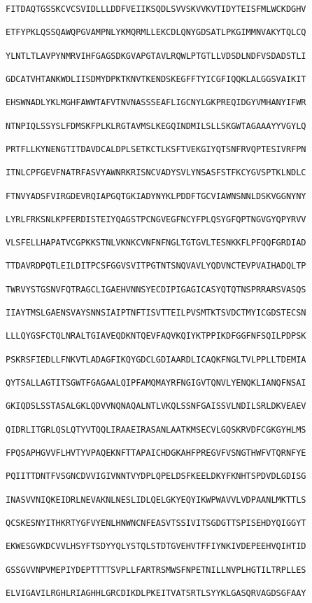 \documentclass[en,black,10pt,normal]{elegantnote}
\begin{document}
\begin{lstlisting}[frame=single]
FITDAQTGSSKCVCSVIDLLLDDFVEIIKSQDLSVVSKVVKVTIDYTEISFMLWCKDGHV

ETFYPKLQSSQAWQPGVAMPNLYKMQRMLLEKCDLQNYGDSATLPKGIMMNVAKYTQLCQ

YLNTLTLAVPYNMRVIHFGAGSDKGVAPGTAVLRQWLPTGTLLVDSDLNDFVSDADSTLI

GDCATVHTANKWDLIISDMYDPKTKNVTKENDSKEGFFTYICGFIQQKLALGGSVAIKIT

EHSWNADLYKLMGHFAWWTAFVTNVNASSSEAFLIGCNYLGKPREQIDGYVMHANYIFWR

NTNPIQLSSYSLFDMSKFPLKLRGTAVMSLKEGQINDMILSLLSKGWTAGAAAYYVGYLQ

PRTFLLKYNENGTITDAVDCALDPLSETKCTLKSFTVEKGIYQTSNFRVQPTESIVRFPN

ITNLCPFGEVFNATRFASVYAWNRKRISNCVADYSVLYNSASFSTFKCYGVSPTKLNDLC

FTNVYADSFVIRGDEVRQIAPGQTGKIADYNYKLPDDFTGCVIAWNSNNLDSKVGGNYNY

LYRLFRKSNLKPFERDISTEIYQAGSTPCNGVEGFNCYFPLQSYGFQPTNGVGYQPYRVV

VLSFELLHAPATVCGPKKSTNLVKNKCVNFNFNGLTGTGVLTESNKKFLPFQQFGRDIAD

TTDAVRDPQTLEILDITPCSFGGVSVITPGTNTSNQVAVLYQDVNCTEVPVAIHADQLTP

TWRVYSTGSNVFQTRAGCLIGAEHVNNSYECDIPIGAGICASYQTQTNSPRRARSVASQS

IIAYTMSLGAENSVAYSNNSIAIPTNFTISVTTEILPVSMTKTSVDCTMYICGDSTECSN

LLLQYGSFCTQLNRALTGIAVEQDKNTQEVFAQVKQIYKTPPIKDFGGFNFSQILPDPSK

PSKRSFIEDLLFNKVTLADAGFIKQYGDCLGDIAARDLICAQKFNGLTVLPPLLTDEMIA

QYTSALLAGTITSGWTFGAGAALQIPFAMQMAYRFNGIGVTQNVLYENQKLIANQFNSAI

GKIQDSLSSTASALGKLQDVVNQNAQALNTLVKQLSSNFGAISSVLNDILSRLDKVEAEV

QIDRLITGRLQSLQTYVTQQLIRAAEIRASANLAATKMSECVLGQSKRVDFCGKGYHLMS

FPQSAPHGVVFLHVTYVPAQEKNFTTAPAICHDGKAHFPREGVFVSNGTHWFVTQRNFYE

PQIITTDNTFVSGNCDVVIGIVNNTVYDPLQPELDSFKEELDKYFKNHTSPDVDLGDISG

INASVVNIQKEIDRLNEVAKNLNESLIDLQELGKYEQYIKWPWAVVLVDPAANLMKTTLS

QCSKESNYITHKRTYGFVYENLHNWNCNFEASVTSSIVITSGDGTTSPISEHDYQIGGYT

EKWESGVKDCVVLHSYFTSDYYQLYSTQLSTDTGVEHVTFFIYNKIVDEPEEHVQIHTID

GSSGVVNPVMEPIYDEPTTTTSVPLLFARTRSMWSFNPETNILLNVPLHGTILTRPLLES

ELVIGAVILRGHLRIAGHHLGRCDIKDLPKEITVATSRTLSYYKLGASQRVAGDSGFAAY


\end{lstlisting}
\end{document}
